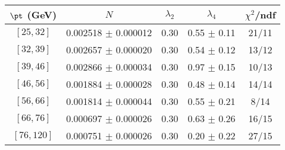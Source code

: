 \begin{tabular}{c||c|c|c|c}
$\pt$ (GeV) & $N$ & $\lambda_{2}$ & $\lambda_4$  & $\chi^2$/ndf  \\
\hline
$[25, 32]$ & 0.002518 $\pm$ 0.000012 & 0.30 & 0.55 $\pm$ 0.11 & 21/11\\
$[32, 39]$ & 0.002657 $\pm$ 0.000020 & 0.30 & 0.54 $\pm$ 0.12 & 13/12\\
$[39, 46]$ & 0.002866 $\pm$ 0.000034 & 0.30 & 0.97 $\pm$ 0.15 & 10/13\\
$[46, 56]$ & 0.001884 $\pm$ 0.000028 & 0.30 & 0.48 $\pm$ 0.14 & 14/14\\
$[56, 66]$ & 0.001814 $\pm$ 0.000044 & 0.30 & 0.55 $\pm$ 0.21 & 8/14\\
$[66, 76]$ & 0.000697 $\pm$ 0.000026 & 0.30 & 0.63 $\pm$ 0.26 & 16/15\\
$[76, 120]$ & 0.000751 $\pm$ 0.000026 & 0.30 & 0.20 $\pm$ 0.22 & 27/15\\
\end{tabular}

